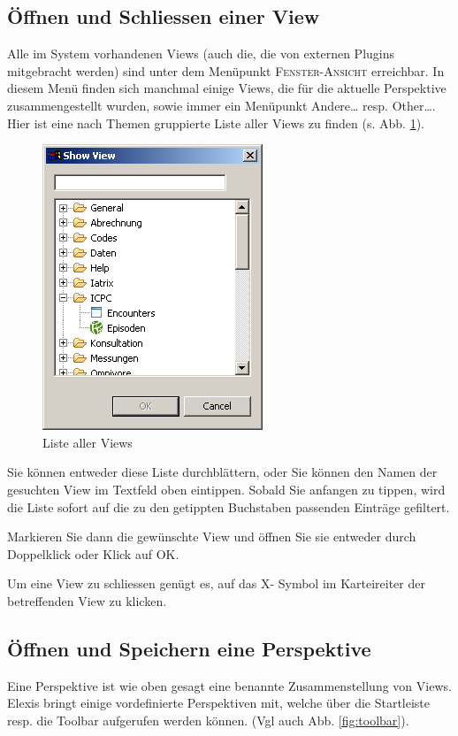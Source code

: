 \subsection{Öffnen und Schliessen einer View}
Alle im System vorhandenen Views (auch die, die von externen Plugins mitgebracht
werden) sind unter dem Menüpunkt \textsc{Fenster-Ansicht} erreichbar. In diesem
Menü finden sich manchmal einige Views, die für die aktuelle Perspektive
zusammengestellt wurden, sowie immer ein Menüpunkt \glqq Andere\ldots\grqq{}
resp. \glqq Other\ldots\grqq{}. Hier ist eine nach Themen gruppierte Liste aller
Views zu finden (s. Abb. \ref{fig:viewlist}).
\begin{figure}[htp]
\begin{center}
  \includegraphics{images/showviewdialog}
  \caption{Liste aller Views}
  \label{fig:viewlist}
\end{center}
\end{figure}

Sie können entweder diese Liste durchblättern, oder Sie können den Namen der
gesuchten View im Textfeld oben eintippen. Sobald Sie anfangen zu tippen, wird
die Liste sofort auf die zu den getippten Buchstaben passenden Einträge
gefiltert.

Markieren Sie dann die gewünschte View und öffnen Sie sie entweder durch
Doppelklick oder Klick auf \glqq OK\grqq{}.

\par
Um eine View zu schliessen genügt es, auf das  X- Symbol im Karteireiter der
betreffenden View zu klicken.

\subsection{Öffnen und Speichern eine Perspektive}
\label{perspektiven} 
Eine Perspektive ist wie oben gesagt eine benannte Zusammenstellung von Views.
Elexis bringt einige vordefinierte Perspektiven mit, welche über die Startleiste
resp. die Toolbar aufgerufen werden können. (Vgl auch Abb. \ref{fig:toolbar}).

